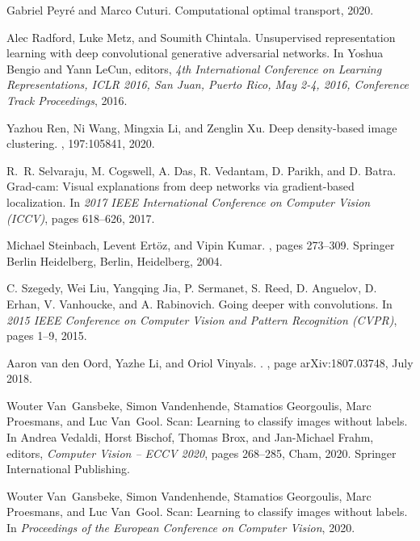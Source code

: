 \documentclass[journal]{IEEEtran}
\begin{document}
{\begin{thebibliography}{10}
Gabriel Peyré and Marco Cuturi.
\newblock Computational optimal transport, 2020.

Alec Radford, Luke Metz, and Soumith Chintala.
\newblock Unsupervised representation learning with deep convolutional
  generative adversarial networks.
\newblock In Yoshua Bengio and Yann LeCun, editors, {\em 4th International
  Conference on Learning Representations, {ICLR} 2016, San Juan, Puerto Rico,
  May 2-4, 2016, Conference Track Proceedings}, 2016.

Yazhou Ren, Ni Wang, Mingxia Li, and Zenglin Xu.
\newblock Deep density-based image clustering.
, 197:105841, 2020.

R.~R. {Selvaraju}, M. {Cogswell}, A. {Das}, R. {Vedantam}, D. {Parikh}, and D.
  {Batra}.
\newblock Grad-cam: Visual explanations from deep networks via gradient-based
  localization.
\newblock In {\em 2017 IEEE International Conference on Computer Vision
  (ICCV)}, pages 618--626, 2017.

Michael Steinbach, Levent Ert{\"o}z, and Vipin Kumar.
, pages
  273--309.
\newblock Springer Berlin Heidelberg, Berlin, Heidelberg, 2004.

C. {Szegedy}, {Wei Liu}, {Yangqing Jia}, P. {Sermanet}, S. {Reed}, D.
  {Anguelov}, D. {Erhan}, V. {Vanhoucke}, and A. {Rabinovich}.
\newblock Going deeper with convolutions.
\newblock In {\em 2015 IEEE Conference on Computer Vision and Pattern
  Recognition (CVPR)}, pages 1--9, 2015.

Aaron {van den Oord}, Yazhe {Li}, and Oriol {Vinyals}.
.
, page arXiv:1807.03748, July 2018.

Wouter Van~Gansbeke, Simon Vandenhende, Stamatios Georgoulis, Marc Proesmans,
  and Luc Van~Gool.
\newblock Scan: Learning to classify images without labels.
\newblock In Andrea Vedaldi, Horst Bischof, Thomas Brox, and Jan-Michael Frahm,
  editors, {\em Computer Vision -- ECCV 2020}, pages 268--285, Cham, 2020.
  Springer International Publishing.

Wouter Van~Gansbeke, Simon Vandenhende, Stamatios Georgoulis, Marc Proesmans,
  and Luc Van~Gool.
\newblock Scan: Learning to classify images without labels.
\newblock In {\em Proceedings of the European Conference on Computer Vision},
  2020.


\end{thebibliography}}
\end{document}
